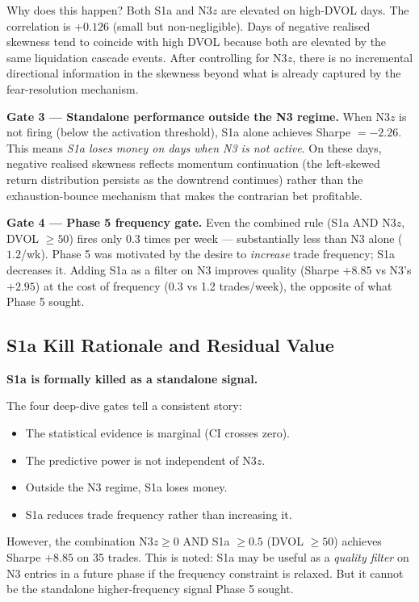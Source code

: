 \documentclass[12pt, a4paper]{article}
\theoremstyle{plain}
\theoremstyle{definition}
\begin{document}
Why does this happen?  Both S1a and N3$z$ are elevated on high-DVOL
days.  The correlation is $+0.126$ (small but non-negligible).  Days of
negative realised skewness tend to coincide with high DVOL because both
are elevated by the same liquidation cascade events.  After controlling
for N3$z$, there is no incremental directional information in the
skewness beyond what is already captured by the fear-resolution mechanism.

\textbf{Gate 3 --- Standalone performance outside the N3 regime.}
When N3$z$ is not firing (below the activation threshold), S1a alone
achieves Sharpe $= -2.26$.  This means \emph{S1a loses money on days
when N3 is not active}.  On these days, negative realised skewness
reflects momentum continuation (the left-skewed return distribution
persists as the downtrend continues) rather than the exhaustion-bounce
mechanism that makes the contrarian bet profitable.

\textbf{Gate 4 --- Phase 5 frequency gate.}
Even the combined rule (S1a AND N3$z$, DVOL $\geq 50$) fires only
$0.3$ times per week --- substantially less than N3 alone ($1.2$/wk).
Phase 5 was motivated by the desire to \emph{increase} trade frequency;
S1a decreases it.  Adding S1a as a filter on N3 improves quality
(Sharpe $+8.85$ vs N3's $+2.95$) at the cost of frequency (0.3 vs 1.2
trades/week), the opposite of what Phase 5 sought.

\subsection{S1a Kill Rationale and Residual Value}

\textbf{S1a is formally killed as a standalone signal.}

The four deep-dive gates tell a consistent story:
\begin{itemize}
  \item The statistical evidence is marginal (CI crosses zero).
  \item The predictive power is not independent of N3$z$.
  \item Outside the N3 regime, S1a loses money.
  \item S1a reduces trade frequency rather than increasing it.
\end{itemize}

However, the combination N3$z \geq 0$ AND S1a $\geq 0.5$ (DVOL $\geq 50$)
achieves Sharpe $+8.85$ on 35 trades.  This is noted: S1a may be useful
as a \emph{quality filter} on N3 entries in a future phase if the
frequency constraint is relaxed.  But it cannot be the standalone
higher-frequency signal Phase 5 sought.
\end{document}
